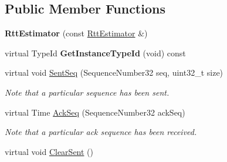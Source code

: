 \subsection*{Public Member Functions}
\begin{DoxyCompactItemize}
\item 
{\bfseries Rtt\+Estimator} (const \hyperlink{classns3_1_1ndn_1_1RttEstimator}{Rtt\+Estimator} \&)\hypertarget{classns3_1_1ndn_1_1RttEstimator_a8adf9c25e6c88ff4e7b398d09fa596b1}{}\label{classns3_1_1ndn_1_1RttEstimator_a8adf9c25e6c88ff4e7b398d09fa596b1}

\item 
virtual Type\+Id {\bfseries Get\+Instance\+Type\+Id} (void) const\hypertarget{classns3_1_1ndn_1_1RttEstimator_a48c1992f5fc97462fc7ca58d00e97c5d}{}\label{classns3_1_1ndn_1_1RttEstimator_a48c1992f5fc97462fc7ca58d00e97c5d}

\item 
virtual void \hyperlink{classns3_1_1ndn_1_1RttEstimator_ab1e5b96ab70fa4c33689868f16879c09}{Sent\+Seq} (Sequence\+Number32 seq, uint32\+\_\+t size)
\begin{DoxyCompactList}\small\item\em Note that a particular sequence has been sent. \end{DoxyCompactList}\item 
virtual Time \hyperlink{classns3_1_1ndn_1_1RttEstimator_a950ad5e00fc80522219811ab0f14b4c8}{Ack\+Seq} (Sequence\+Number32 ack\+Seq)
\begin{DoxyCompactList}\small\item\em Note that a particular ack sequence has been received. \end{DoxyCompactList}\item 
virtual void \hyperlink{classns3_1_1ndn_1_1RttEstimator_a66d4789bb680ec40be57d6c45547bf4b}{Clear\+Sent} ()\hypertarget{classns3_1_1ndn_1_1RttEstimator_a66d4789bb680ec40be57d6c45547bf4b}{}\label{classns3_1_1ndn_1_1RttEstimator_a66d4789bb680ec40be57d6c45547bf4b}


\end{DoxyCompactItemize}
